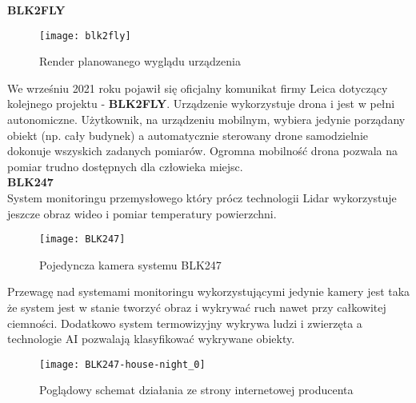 \textbf{BLK2FLY}

\begin{figure}[h]
    \centering
    \texttt{[image: blk2fly]}
    \caption{Render planowanego wyglądu urządzenia \cite{blk2fly}}
    \label{fig:blk2fly}
\end{figure}

We wrześniu 2021 roku pojawił się oficjalny komunikat firmy Leica dotyczący kolejnego projektu - \textbf{BLK2FLY}. Urządzenie wykorzystuje drona i jest w pełni autonomiczne. Użytkownik, na urządzeniu mobilnym, wybiera jedynie porządany obiekt (np. cały budynek) a automatycznie sterowany drone samodzielnie dokonuje wszyskich zadanych pomiarów. Ogromna mobilność drona pozwala na pomiar trudno dostępnych dla człowieka miejsc.\\

\textbf{BLK247}\\
System monitoringu przemysłowego który prócz technologii Lidar wykorzystuje jeszcze obraz wideo i pomiar temperatury powierzchni.\\
\begin{figure}[h]
    \centering
    \texttt{[image: BLK247]}
    \caption{Pojedyncza kamera systemu BLK247 \cite{blk247}}
    \label{fig:blk247}
\end{figure}
Przewagę nad systemami monitoringu wykorzystującymi jedynie kamery jest taka że system jest w stanie tworzyć obraz i wykrywać ruch nawet przy całkowitej ciemności. Dodatkowo system termowizyjny wykrywa ludzi i zwierzęta a technologie AI pozwalają klasyfikować wykrywane obiekty.

\begin{figure}[h]
    \centering
    \texttt{[image: BLK247-house-night\_0]}
    \caption{Poglądowy schemat działania ze strony internetowej producenta \cite{blk247}}
    \label{fig:house-night}
\end{figure}


